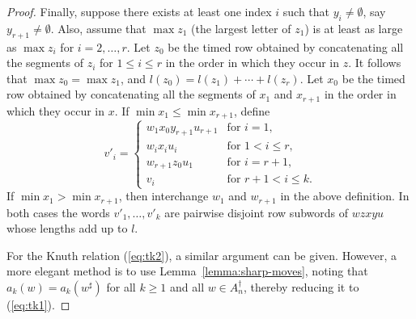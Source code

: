 \documentclass[10pt]{amsproc}
\theoremstyle{definition}
\theoremstyle{remark}
\begin{document}
\begin{proof}
  Finally, suppose there exists at least one index $i$ such that $y_i\neq \emptyset$, say $y_{r+1}\neq \emptyset$.
  Also, assume that $\max z_1$ (the largest letter of $z_1$) is at least as large as $\max z_i$ for $i=2,\dotsc,r$.
  Let $z_0$ be the timed row obtained by concatenating all the segments of $z_i$ for $1\leq i\leq r$ in the order in which they occur in $z$.
  It follows that $\max z_0 = \max z_1$, and $l(z_0)=l(z_1)+\dotsb+l(z_r)$.
  Let $x_0$ be the timed row obtained by concatenating all the segments of $x_1$ and $x_{r+1}$ in the order in which they occur in $x$.
  If $\min x_1\leq \min x_{r+1}$, define
  \begin{displaymath}
    v'_i = 
    \begin{cases}
      w_1x_0y_{r+1}u_{r+1} & \text{for }i=1,\\
      w_ix_iu_i & \text{for }1<i\leq r,\\
      w_{r+1}z_0u_1 &\text{for }i=r+1,\\
      v_i&\text{for }r+1<i\leq k.
    \end{cases}
  \end{displaymath}
  If $\min x_1>\min x_{r+1}$, then interchange $w_1$ and $w_{r+1}$ in the above definition.
  In both cases the words $v'_1,\dotsc, v'_k$ are pairwise disjoint row subwords of $wzxyu$ whose lengths add up to $l$.

  For the Knuth relation (\ref{eq:tk2}), a similar argument can be given.
  However, a more elegant method is to use Lemma~\ref{lemma:sharp-moves}, noting that $a_k(w)=a_k(w^\sharp)$ for all $k\geq 1$ and all $w\in A_n^\dagger$, thereby reducing it to (\ref{eq:tk1}).
\end{proof}\pagebreak
\end{document}
